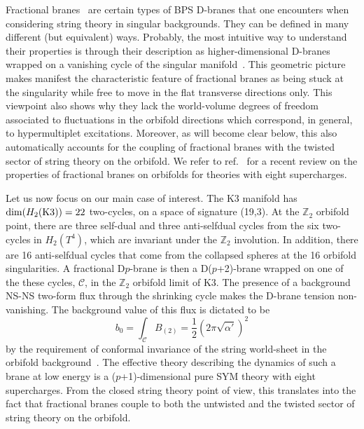 \documentclass[a4paper,11pt]{article}
\newcommand{\ZZ}{\mathbb{Z}}  \newcommand{\Zint}{\mathbb{Z}}
\begin{document}
Fractional
branes~\cite{Douglas:1997xg,Douglas:1997de,Polchinski:1997ry} are
certain types of BPS D-branes that one encounters when considering
string theory in singular backgrounds. They can be defined in many
different (but equivalent) ways. Probably, the most intuitive way to
understand their properties is through their description as
higher-dimensional D-branes wrapped on a vanishing cycle of the
singular manifold~\cite{Diaconescu:1998br,Billo:2000yb}. This
geometric picture makes manifest the characteristic feature of
fractional branes as being stuck at the singularity while free to move
in the flat transverse directions only. This viewpoint also shows why
they lack the world-volume degrees of freedom associated to
fluctuations in the orbifold directions which correspond, in general,
to hypermultiplet excitations. Moreover, as will become clear below,
this also automatically accounts for the coupling of fractional branes
with the twisted sector of string theory on the orbifold. We refer to
ref.~\cite{Bertolini:2001gq} for a recent review on the properties of
fractional branes on orbifolds for theories with eight supercharges.

Let us now focus on our main case of interest. The K3 manifold has
${\rm dim}(H_2(\mathrm{K3}))\allowbreak=22$ two-cycles, on a space
of signature (19,3). At the $\ZZ_2$ orbifold point, there are three
self-dual and three anti-selfdual cycles from the six two-cycles in
$H_2(T^4)$, which are invariant under the $\ZZ_2$ involution. In
addition, there are 16 anti-selfdual cycles that come from the
collapsed spheres at the 16 orbifold singularities. A fractional
D$p$-brane is then a D($p$+2)-brane wrapped on one of the these
cycles, $\mathcal{C}$, in the $\ZZ_2$ orbifold limit of K3. The
presence of a background NS-NS two-form flux through the shrinking
cycle makes the D-brane tension non-vanishing. The background value
of this flux is dictated to be
\begin{equation}
\label{bgPhi}
b_0 = \int_{\mathcal{C}} B_{(2)} = \frac{1}{2}(2\pi\sqrt{\alpha'})^2
\end{equation}
by the requirement of conformal invariance of the string world-sheet
in the orbifold background~\cite{Aspinwall:1996mn}. The effective
theory describing the dynamics of such a brane at low energy is a
($p$+1)-dimensional pure SYM theory with eight supercharges. From the
closed string theory point of view, this translates into the fact that
fractional branes couple to both the untwisted and the twisted sector
of string theory on the orbifold.
\end{document}
